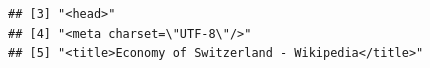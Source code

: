 \documentclass[
  12pt,
]{style/krantz}
\begin{document}
\begin{verbatim}
## [3] "<head>"                                                                                                                                                                                                                                                                                                                                                                                                                                                                                                                                                                                                                                                                                                                                                                                                                                                                                                                                                                                                                                                                                                                                                 
## [4] "<meta charset=\"UTF-8\"/>"                                                                                                                                                                                                                                                                                                                                                                                                                                                                                                                                                                                                                                                                                                                                                                                                                                                                                                                                                                                                                                                                                                                              
## [5] "<title>Economy of Switzerland - Wikipedia</title>"                                                                                                                                                                                                                                                                                                                                                                                                                                                                                                                                                                                                                                                                                                                                                                                                                                                                                                                                                                                                                                                                                                      

\end{verbatim}
\end{document}
